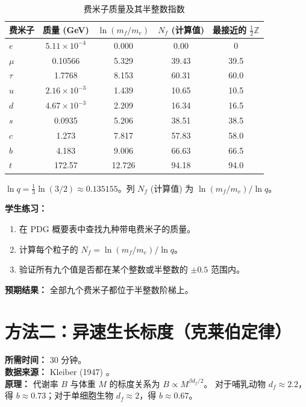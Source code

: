 \documentclass[12pt,a4paper]{article}
\begin{document}
	\begin{table}[H]
		\centering
		\caption{费米子质量及其半整数指数}
		\label{tab:fermions}
		\begin{tabular}{l c c c c}
			\toprule
			费米子 & 质量 (GeV) & \(\ln(m_f/m_e)\) & \(N_f\) (计算值) & 最接近的 \(\frac{1}{2}\mathbb{Z}\) \\
			\midrule
			\(e\)   & \(5.11\times10^{-4}\) & 0.000  & 0.00  & 0 \\
			\(\mu\)  & 0.10566 & 5.329  & 39.43 & 39.5 \\
			\(\tau\) & 1.7768  & 8.153  & 60.31 & 60.0 \\
			\(u\)   & \(2.16\times10^{-3}\) & 1.439  & 10.65 & 10.5 \\
			\(d\)   & \(4.67\times10^{-3}\) & 2.209  & 16.34 & 16.5 \\
			\(s\)   & 0.0935  & 5.206  & 38.51 & 38.5 \\
			\(c\)   & 1.273   & 7.817  & 57.83 & 58.0 \\
			\(b\)   & 4.183   & 9.006  & 66.63 & 66.5 \\
			\(t\)   & 172.57  & 12.726 & 94.18 & 94.0 \\
			\bottomrule
		\end{tabular}
		\par\smallskip
		\footnotesize
		\(\ln q = \frac{1}{3}\ln(3/2) \approx 0.135155\)。列 \(N_f\) (计算值) 为 \(\ln(m_f/m_e)/\ln q\)。
	\end{table}
	
	\textbf{学生练习：}
	\begin{enumerate}[label=(\arabic*)]
		\item 在 PDG 概要表中查找九种带电费米子的质量。
		\item 计算每个粒子的 \(N_f = \ln(m_f / m_e) / \ln q\)。
		\item 验证所有九个值是否都在某个整数或半整数的 \(\pm 0.5\) 范围内。
	\end{enumerate}
	
	\textbf{预期结果：} 全部九个费米子都位于半整数阶梯上。
	
	\section{方法二：异速生长标度（克莱伯定律）}
	\label{sec:kleiber}
	
	\textbf{所需时间：} 30 分钟。\\
	\textbf{数据来源：} Kleiber (1947) \cite{Kleiber1947}。\\
	\textbf{原理：} 代谢率 \(B\) 与体重 \(M\) 的标度关系为 \(B \propto M^{\beta d_f/2}\)。
	对于哺乳动物 \(d_f \approx 2.2\)，得 \(b \approx 0.73\)；对于单细胞生物 \(d_f \approx 2\)，得 \(b \approx 0.67\)。
	
\end{document}
